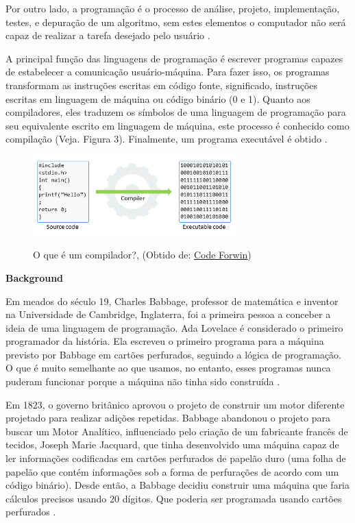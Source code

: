 \documentclass[11pt, letterpaper, portuguese]{article}
\begin{document}
     \par{Por outro lado, a programação é o processo de análise, projeto, implementação, testes, e depuração de um algoritmo, sem estes elementos o computador não será capaz de realizar a tarefa desejado pelo usuário  \cite{garfinkel_shevtsov_guo_2017}.} 

    \par{A principal função das linguagens de programação é escrever programas capazes de estabelecer a comunicação usuário-máquina. Para fazer isso, os programas transformam as instruções escritas em código fonte, significado, instruções escritas em linguagem de máquina ou código binário (0 e 1). Quanto aos compiladores, eles traduzem os símbolos de uma linguagem de programação para seu equivalente escrito em linguagem de máquina, este processo é conhecido como compilação (Veja. Figura 3). Finalmente, um programa executável é obtido  \cite{garfinkel_shevtsov_guo_2017}.}
   
	\begin{figure}
	    \centering
		\caption{O que é um compilador?, (Obtido de: \href{https://codeforwin.org/2017/05/compiler-and-its-need.html}{Code Forwin})}
		\includegraphics[width=0.7\textwidth]{compiler}
		\label{Fig-Compiler}
	\end{figure}


\textbf{Background}

\par{Em meados do século 19, Charles Babbage, professor de matemática e inventor na Universidade de Cambridge, Inglaterra, foi a primeira pessoa a conceber a ideia de uma linguagem de programação. Ada Lovelace é considerado o primeiro programador da história. Ela escreveu o primeiro programa para a máquina previsto por Babbage em cartões perfurados, seguindo a lógica de programação. O que é muito semelhante ao que usamos, no entanto, esses programas nunca puderam funcionar porque a máquina não tinha sido construída  \cite{garfinkel_shevtsov_guo_2017}.} 
\vspace{0.5 cm}
	
	
\par{Em 1823, o governo britânico aprovou o projeto de construir um motor diferente projetado para realizar adições repetidas. Babbage abandonou o projeto para buscar um Motor Analítico, influenciado pelo criação de um fabricante francês de tecidos, Joseph Marie Jacquard, que tinha desenvolvido uma máquina capaz de ler informações codificadas em cartões perfurados de papelão duro (uma folha de papelão que contém informações sob a forma de perfurações de acordo com um código binário). Desde então, a Babbage decidiu construir uma máquina que faria cálculos precisos usando 20 dígitos. Que poderia ser programada usando cartões perfurados  \cite{garfinkel_shevtsov_guo_2017}.} 
\end{document}
